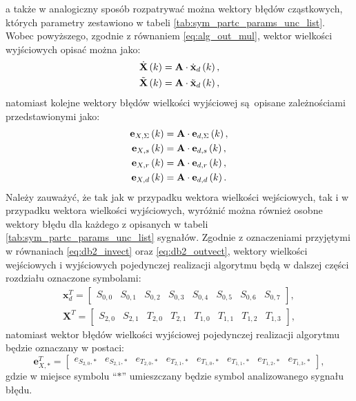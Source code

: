 a także w analogiczny sposób rozpatrywać można wektory błędów cząstkowych, których parametry zestawiono w tabeli \ref{tab:sym_partc_params_unc_list}. Wobec powyższego, zgodnie z równaniem \eqref{eq:alg_out_mul}, wektor wielkości wyjściowych opisać można jako:
\begin{gather}
\dot{\mathbf{X}} \left(k\right) = \mathbf{A} \cdot \dot{\mathbf{x}}_{d} \left(k\right) \label{eq:sym_partd_output_ideal}, \\
\tilde{\mathbf{X}} \left(k\right) = \mathbf{A} \cdot \tilde{\mathbf{x}}_{d} \left(k\right) \label{eq:sym_partd_output_real},
\end{gather}
natomiast kolejne wektory błędów wielkości wyjściowej są opisane zależnościami przedstawionymi jako:
\begin{gather}
\mathbf{e}_{X,\Sigma} \left(k\right) = \mathbf{A} \cdot \mathbf{e}_{d,\Sigma} \left(k\right) \label{eq:sym_partd_output_error_sum}, \\
\mathbf{e}_{X,s} \left(k\right) = \mathbf{A} \cdot \mathbf{e}_{d,s} \left(k\right) \label{eq:sym_partd_output_error_stat}, \\
\mathbf{e}_{X,r} \left(k\right) = \mathbf{A} \cdot \mathbf{e}_{d,r} \left(k\right) \label{eq:sym_partd_output_error_rand}, \\
\mathbf{e}_{X,d} \left(k\right) = \mathbf{A} \cdot \mathbf{e}_{d,d} \left(k\right) \label{eq:sym_partd_output_error_dyn}.
\end{gather}
Należy zauważyć, że tak jak w przypadku wektora wielkości wejściowych, tak i w przypadku wektora wielkości wyjściowych, wyróżnić można również osobne wektory błędu dla każdego z opisanych w tabeli \ref{tab:sym_partc_params_unc_list} sygnałów. Zgodnie z oznaczeniami przyjętymi w równaniach \eqref{eq:db2_invect} oraz \eqref{eq:db2_outvect}, wektory wielkości wejściowych i wyjściowych pojedynczej realizacji algorytmu będą w dalszej części rozdziału oznaczone symbolami:
\begin{gather}
\mathbf{x}_{d}^{T} =
\begin{bmatrix}
S_{0,0} & S_{0,1} & S_{0,2} & S_{0,3} & S_{0,4} & S_{0,5} & S_{0,6} & S_{0,7}
\end{bmatrix}
\label{eq:sym_partd_invect}, \\
\mathbf{X}^{T} =
\begin{bmatrix}
S_{2,0} & S_{2,1} & T_{2,0} & T_{2,1} & T_{1,0} & T_{1,1} & T_{1,2} & T_{1,3}
\end{bmatrix}
\label{eq:sym_partd_outvect},
\end{gather}
natomiast wektor błędów wielkości wyjściowej pojedynczej realizacji algorytmu będzie oznaczany w postaci:
\begin{equation}
\mathbf{e}_{X,*}^{T} =
\begin{bmatrix}
e_{S_{2,0},*} & e_{S_{2,1},*} & e_{T_{2,0},*} & e_{T_{2,1},*} & e_{T_{1,0},*} & e_{T_{1,1},*} & e_{T_{1,2},*} & e_{T_{1,3},*}
\end{bmatrix}
\label{eq:sym_partd_errvect},
\end{equation}
gdzie w miejsce symbolu \enquote{$*$} umieszczany będzie symbol analizowanego sygnału błędu.

